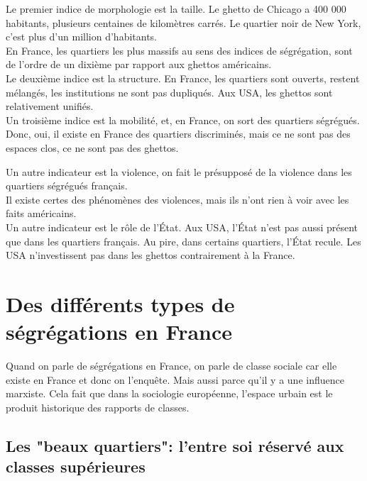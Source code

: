 \documentclass[10pt, a4paper, openany]{book}
\begin{document}
Le premier indice de morphologie est la taille. Le ghetto de Chicago a 400 000 habitants, plusieurs centaines de kilomètres carrés. Le quartier noir de New York, c'est plus d'un million d'habitants. \\
En France, les quartiers les plus massifs au sens des indices de ségrégation, sont de l'ordre de un dixième par rapport aux ghettos américains. \\
Le deuxième indice est la structure. En France, les quartiers sont ouverts, restent mélangés, les institutions ne sont pas dupliqués. Aux USA, les ghettos sont relativement unifiés. \\
Un troisième indice est la mobilité, et, en France, on sort des quartiers ségrégués. \\
Donc, oui, il existe en France des quartiers discriminés, mais ce ne sont pas des espaces clos, ce ne sont pas des ghettos.


Un autre indicateur est la violence, on fait le présupposé de la violence dans les quartiers ségrégués français. \\
Il existe certes des phénomènes des violences, mais ils n'ont rien à voir avec les faits américains. \\
Un autre indicateur est le rôle de l'État. Aux USA, l'État n'est pas aussi présent que dans les quartiers français. Au pire, dans certains quartiers, l'État recule. Les USA n'investissent pas dans les ghettos contrairement à la France. 


\section{Des différents types de ségrégations en France}

Quand on parle de ségrégations en France, on parle de classe sociale car elle existe en France et donc on l'enquête. Mais aussi parce qu'il y a une influence marxiste. Cela fait que dans la sociologie européenne, l'espace urbain est le produit historique des rapports de classes. \\

\subsection{Les "beaux quartiers": l'entre soi réservé aux classes supérieures}
\end{document}
